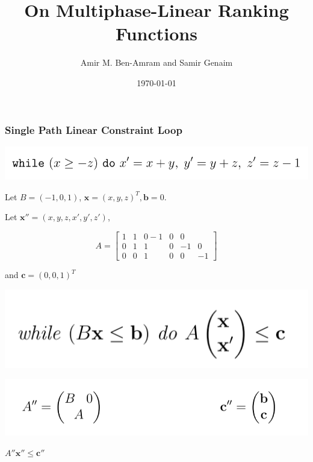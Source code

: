 \documentclass[11pt]{beamer}
\title{On Multiphase-Linear Ranking Functions}
\date{\today}
\author{Amir M. Ben-Amram and Samir Genaim}
\begin{document}
\maketitle


\begin{frame}\frametitle{Single Path Linear Constraint Loop}{\scriptsize
\begin{example}
\begin{center}

\includegraphics[scale = 0.4]{loopExample.png}


\end{center}


Let $B = (-1, 0, 1)$, $\textbf{x} = (x, y, z)^T, \textbf{b} = 0$.

Let $\textbf{x}'' = (x, y, z, x', y', z')$, 

\begin{equation}
A = \left[
\begin{array}{cccccc}
     1 &1 &0 -1 & 0 & 0 \\
     0 & 1 & 1 & 0 & -1 & 0 \\
     0& 0 & 1 & 0 & 0 & -1
\end{array}
\right]
\end{equation}

and $\textbf{c} = (0, 0, 1)^T$


\end{example}




\begin{definition}[SLC]
\includegraphics[scale = 0.28]{1.PNG}


\end{definition}
\begin{center}
\includegraphics[scale = 0.25]{2.PNG}

$A''\textbf{x}'' \le \textbf{c}''$
\end{center}
}
\end{frame}
\end{document}

